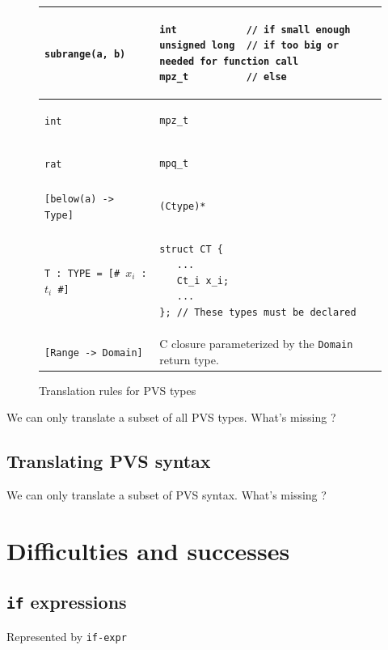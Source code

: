 \documentclass[12pt,a4paper,titlepage]{article}
\newcommand{\cl}[1]{\texttt{#1}}
\begin{document}
\begin{figure}[h!]
\begin{tabular}{|l|l|}
\hline
\cl{subrange(a, b)} &
\begin{lstlisting}
int            // if small enough
unsigned long  // if too big or needed for function call
mpz_t          // else
\end{lstlisting} \\ \hline
\cl{int} &
\begin{lstlisting}
mpz_t
\end{lstlisting} \\ \hline
\cl{rat} &
\begin{lstlisting}
mpq_t
\end{lstlisting} \\ \hline
\cl{[below(a) -> Type]} &
\begin{lstlisting}
(Ctype)*
\end{lstlisting} \\ \hline
\cl{T : TYPE = [\# $x_i$ : $t_i$ \#]}  &
\begin{lstlisting}
struct CT {
   ...
   Ct_i x_i;
   ...
}; // These types must be declared
\end{lstlisting} \\ \hline
\cl{[Range -> Domain]} & C closure parameterized by the \cl{Domain} return type.\\ \hline
\end{tabular}
\caption{Translation rules for PVS types}
\end{figure}









We can only translate a subset of all PVS types.
What's missing ?




\subsection{Translating PVS syntax}


We can only translate a subset of PVS syntax.
What's missing ?



\section{Difficulties and successes}


\subsection{\texttt{if} expressions}
Represented by \texttt{if-expr}
\end{document}

